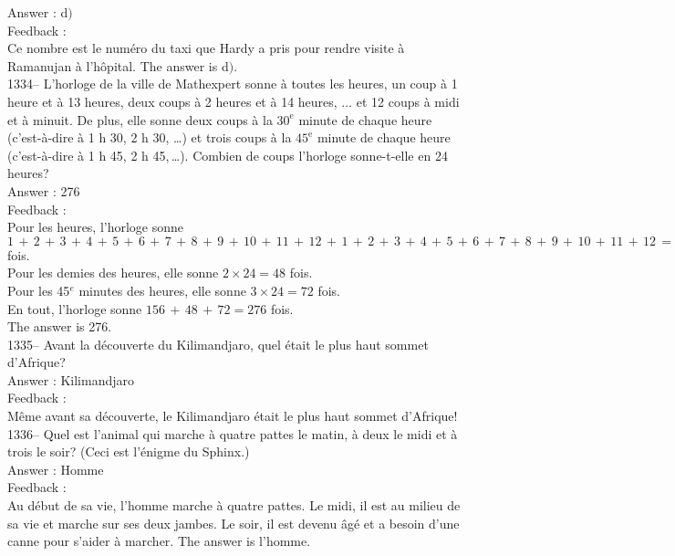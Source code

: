 \documentclass[letterpaper, 12pt]{article}
\begin{document}
Answer : d$)$\\

Feedback : \\
Ce nombre est le num\'ero du taxi que Hardy a pris pour rendre
visite \`a Ramanujan \`a l'h\^opital.
The answer is  d$)$.\\


1334-- L'horloge de la ville de Mathexpert sonne \`a toutes les heures, un
coup \`a 1 heure et \`a 13 heures, deux  coups \`a 2 heures et \`a 14
heures, $\ldots$ et 12 coups \`a midi et \`a minuit.  De plus, elle sonne
deux coups \`a la $30^{\textrm{e}}$ minute de chaque heure (c'est-\`a-dire
\`a 1 h 30, 2 h 30, \ldots) et trois coups \`a la $45^{\textrm{e}}$ minute
de chaque heure (c'est-\`a-dire \`a 1 h 45, 2 h 45,\,\ldots).  Combien de
coups l'horloge sonne-t-elle en 24 heures?\\

Answer : 276\\

Feedback :\\
Pour les heures, l'horloge sonne
$1\,+\,2\,+\,3\,+\,4\,+\,5\,+\,6\,+\,7\,+\,8\,+\,9\,+\,10\,+\,11\,+\,12\,+\,1\,+\,2\,+\,3\,+\,4\,+\,5\,+\,6\,+\,7\,+\,8\,+\,9\,+\,10\,+\,11\,+\,12\,=\,156$
fois.\\
Pour les demies des heures, elle sonne $2\times24=48$ fois.\\
Pour les 45$^e$ minutes des heures, elle sonne $3\times24=72$ fois.\\
En tout, l'horloge sonne $156\,+\,48\,+\,72=276$ fois.\\
The answer is 276.\\



1335-- Avant la d\'ecouverte du Kilimandjaro, quel \'etait le plus haut
sommet d'Afrique?\\

Answer : Kilimandjaro\\

Feedback : \\
M\^eme avant sa d\'ecouverte, le Kilimandjaro \'etait le plus haut sommet
d'Afrique!\\

1336-- Quel est l'animal qui marche \`a quatre pattes le matin, \`a deux le
midi et \`a trois le soir?  (Ceci est l'\'enigme du Sphinx.)\\

Answer : Homme\\

Feedback : \\
Au d\'ebut de sa vie, l'homme marche \`a quatre pattes.  Le midi, il est au
milieu de sa vie et marche sur ses deux jambes.  Le soir, il est devenu
\^ag\'e et a besoin d'une canne pour s'aider \`a marcher.  The answer is
l'homme.\\
\end{document}
